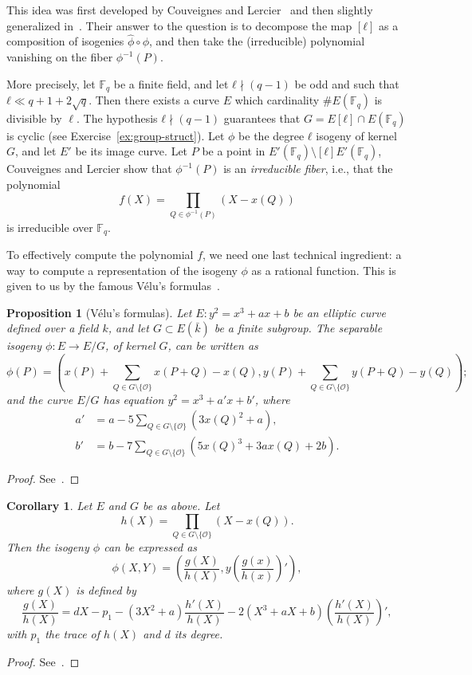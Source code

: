 \documentclass[10pt]{article}
\theoremstyle{plain}
\newtheorem{corollary}[theorem]{Corollary}
\newtheorem{proposition}[theorem]{Proposition}
\theoremstyle{definition}
\def\F{\ensuremath{\mathbb{F}}}
\def\O{\ensuremath{\mathcal{O}}}
\begin{document}
\begin{prposition}
This idea was first developed by Couveignes and
Lercier~\cite{couveignes+lercier11} and then slightly generalized
in~\cite{DeDoSc13}. %
Their answer to the question is to decompose the map $[ℓ]$ as a
composition of isogenies $\hat{ϕ}∘ϕ$, and then take the (irreducible)
polynomial vanishing on the fiber $ϕ^{-1}(P)$.

More precisely, let $\F_q$ be a finite field, and let $ℓ\nmid(q-1)$ be
odd and such that $ℓ\ll q+1+2\sqrt{q}$. %
Then there exists a curve $E$ which cardinality $\#E(\F_q)$ is
divisible by $\ell$. %
The hypothesis $ℓ\nmid(q-1)$ guarantees that $G = E[ℓ]∩E(\F_q)$ is
cyclic (see Exercise~\ref{ex:group-struct}). %
Let $ϕ$ be the degree $ℓ$ isogeny of kernel $G$, and let $E'$ be its
image curve. %
Let $P$ be a point in $E'(\F_q)\setminus [ℓ]E'(\F_q)$, Couveignes and
Lercier show that $\phi^{-1}(P)$ is an \emph{irreducible fiber}, i.e.,
that the polynomial
\[f(X) = \prod_{Q\in\phi^{-1}(P)}(X - x(Q))\]
is irreducible over $\F_q$.

To effectively compute the polynomial $f$, we need one last technical
ingredient: a way to compute a representation of the isogeny $ϕ$ as a
rational function. %
This is given to us by the famous V\'elu's formulas~\cite{velu71}.

\begin{proposition}[V\'elu's formulas]
  Let $E:y^2=x^3+ax+b$ be an elliptic curve defined over a field $k$,
  and let $G⊂E(\bar{k})$ be a finite subgroup. %
  The separable isogeny $ϕ:E\to E/G$, of kernel $G$, can be written as
  \begin{equation*}
    ϕ(P) = \left(
      x(P) + \sum_{Q∈G\setminus\{\O\}}x(P+Q)-x(Q),
      y(P) + \sum_{Q∈G\setminus\{\O\}}y(P+Q)-y(Q)
    \right);
  \end{equation*} %
  and the curve $E/G$ has equation $y^2=x^3+a'x+b'$, where
  \begin{align*}
    a' &= a - 5\sum_{Q∈G\setminus\{\O\}}(3x(Q)^2+a),\\
    b' &= b - 7\sum_{Q∈G\setminus\{\O\}}(5x(Q)^3+3ax(Q)+2b).
  \end{align*}
\end{proposition}
\begin{proof}
  See~\cite[\S8.2]{df+thesis}.
\end{proof}

\begin{corollary}
  Let $E$ and $G$ be as above. %
  Let
  \[h(X) = \prod_{Q∈G\setminus\{\O\}}(X-x(Q)).\]
  Then the isogeny $ϕ$ can be expressed as
  \[ϕ(X,Y) = \left(\frac{g(X)}{h(X)}, y\left(\frac{g(x)}{h(x)}\right)'\right),\]
  where $g(X)$ is defined by
  \[\frac{g(X)}{h(X)} = dX-p_1-(3X^2+a)\frac{h'(X)}{h(X)}
    - 2(X^3+aX+b)\left(\frac{h'(X)}{h(X)}\right)',\]
  with $p_1$ the trace of $h(X)$ and $d$ its degree.
\end{corollary}
\begin{proof}
  See~\cite[\S8.2]{df+thesis}.
\end{proof}


\end{prposition}
\end{document}
